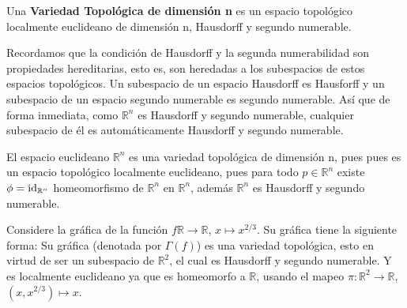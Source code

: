 \documentclass[12pt]{report}
\theoremstyle{largebreak}
\begin{document}
    \begin{mydef}
        Una \textbf{Variedad Topológica de dimensión n} es un espacio topológico localmente euclideano de dimensión n, Hausdorff y segundo numerable.
    \end{mydef}

    Recordamos que la condición de Hausdorff y la segunda numerabilidad son propiedades hereditarias, esto es, son heredadas a los subespacios de estos espacios topológicos. Un subespacio de un espacio Hausdorff es Hausforff y un subespacio de un espacio segundo numerable es segundo numerable. Así que de forma inmediata, como $\mathbb{R}^n$ es Hausdorff y segundo numerable, cualquier subespacio de él es automáticamente Hausdorff y segundo numerable.

    \begin{exa}
        El espacio euclideano $\mathbb{R}^n$ es una variedad topológica de dimensión n, pues pues es un espacio topológico localmente euclideano, pues para todo $p\in\mathbb{R}^n$ existe $\phi=\textup{id}_{\mathbb{R}^n}$ homeomorfismo de $\mathbb{R}^n$ en $\mathbb{R}^n$, además $\mathbb{R}^n$ es Hausdorff y segundo numerable.
    \end{exa}

    \begin{exa}
        Considere la gráfica de la función $f\mathbb{R}\rightarrow\mathbb{R}$, $x\mapsto x^{2/3}$. Su gráfica tiene la siguiente forma:
        Su gráfica (denotada por $\Gamma(f)$) es una variedad topológica, esto en virtud de ser un subespacio de $\mathbb{R}^2$, el cual es Hausdorff y segundo numerable. Y es localmente euclideano ya que es homeomorfo a $\mathbb{R}$, usando el mapeo $\pi:\mathbb{R}^2\rightarrow\mathbb{R}$, $(x,x^{2/3})\mapsto x$.
    \end{exa}
\end{document}
